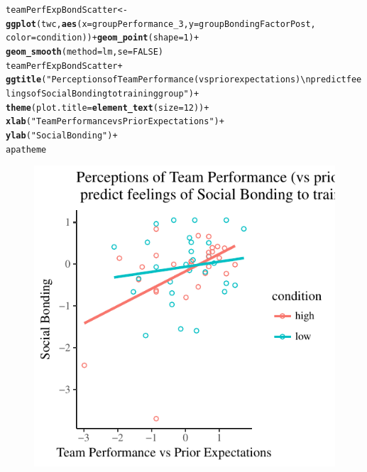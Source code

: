 \documentclass[english]{article}\usepackage[]{graphicx}\usepackage[]{color}
\makeatletter
\def\maxwidth{ %
  \ifdim\Gin@nat@width>\linewidth
    \linewidth
  \else
    \Gin@nat@width
  \fi
}
\newcommand{\hlnum}[1]{\textcolor[rgb]{0.686,0.059,0.569}{#1}}%
\newcommand{\hlstr}[1]{\textcolor[rgb]{0.192,0.494,0.8}{#1}}%
\newcommand{\hlopt}[1]{\textcolor[rgb]{0,0,0}{#1}}%
\newcommand{\hlstd}[1]{\textcolor[rgb]{0.345,0.345,0.345}{#1}}%
\newcommand{\hlkwb}[1]{\textcolor[rgb]{0.69,0.353,0.396}{#1}}%
\newcommand{\hlkwc}[1]{\textcolor[rgb]{0.333,0.667,0.333}{#1}}%
\newcommand{\hlkwd}[1]{\textcolor[rgb]{0.737,0.353,0.396}{\textbf{#1}}}%
\newenvironment{kframe}{%
 \def\at@end@of@kframe{}%
 \ifinner\ifhmode%
  \def\at@end@of@kframe{\end{minipage}}%
  \begin{minipage}{\columnwidth}%
 \fi\fi%
 \def\FrameCommand##1{\hskip\@totalleftmargin \hskip-\fboxsep
 \colorbox{shadecolor}{##1}\hskip-\fboxsep
     \hskip-\linewidth \hskip-\@totalleftmargin \hskip\columnwidth}%
 \MakeFramed {\advance\hsize-\width
   \@totalleftmargin\z@ \linewidth\hsize
   \@setminipage}}%
 {\par\unskip\endMakeFramed%
 \at@end@of@kframe}
\newenvironment{knitrout}{}{} %
\makeatother
\begin{document}
\begin{knitrout}
\color{fgcolor}\begin{kframe}
\begin{alltt}
\hlstd{teamPerfExpBondScatter} \hlkwb{<-} \hlkwd{ggplot}\hlstd{(twc,} \hlkwd{aes}\hlstd{(}\hlkwc{x}\hlstd{=groupPerformance_3,} \hlkwc{y}\hlstd{=groupBondingFactorPost,}
                            \hlkwc{color}\hlstd{=condition))} \hlopt{+} \hlkwd{geom_point}\hlstd{(}\hlkwc{shape} \hlstd{=} \hlnum{1}\hlstd{)} \hlopt{+}
                            \hlkwd{geom_smooth}\hlstd{(}\hlkwc{method}\hlstd{=lm,} \hlkwc{se}\hlstd{=}\hlnum{FALSE}\hlstd{)}
\hlstd{teamPerfExpBondScatter} \hlopt{+}
            \hlkwd{ggtitle}\hlstd{(}\hlstr{"Perceptions of Team Performance (vs prior expectations) \textbackslash{}n predict feelings of Social Bonding to training group"}\hlstd{)} \hlopt{+}
            \hlkwd{theme}\hlstd{(}\hlkwc{plot.title} \hlstd{=} \hlkwd{element_text}\hlstd{(}\hlkwc{size}\hlstd{=}\hlnum{12}\hlstd{))} \hlopt{+}
            \hlkwd{xlab}\hlstd{(}\hlstr{"Team Performance vs Prior Expectations"}\hlstd{)} \hlopt{+}
            \hlkwd{ylab}\hlstd{(}\hlstr{"Social Bonding"}\hlstd{)} \hlopt{+}
            \hlstd{apatheme}
\end{alltt}


{\ttfamily\noindent\color{warningcolor}{\#\# Warning: Removed 1 rows containing non-finite values (stat\_smooth).}}

{\ttfamily\noindent\color{warningcolor}{\#\# Warning: Removed 1 rows containing missing values (geom\_point).}}\end{kframe}\begin{figure}

{\centering \includegraphics[width=\maxwidth]{figure/teamPerfExpBondScatter-1} 

}

\end{figure}


\end{knitrout}
\end{document}
